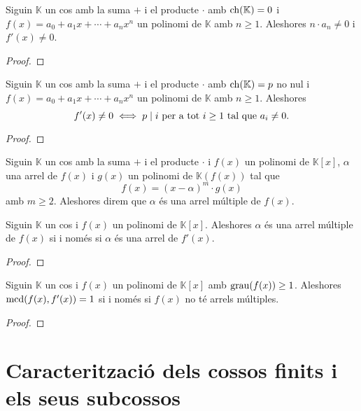 \documentclass[../Apunts.tex]{subfiles}
\begin{document}
	\begin{proposition}
		Siguin \(\mathbb{K}\) un cos amb la suma \(+\) i el producte \(\cdot\) amb \(\operatorname{ch}(\mathbb{K})=0\) i \(f(x)=a_{0}+a_{1}x+\cdots+a_{n}x^{n}\) un polinomi de \(\mathbb{K}\) amb \(n\geq1\). Aleshores \(n\cdot a_{n}\neq0\) i \(f'(x)\neq0\).
		\begin{proof}
		\end{proof}
	\end{proposition}
	\begin{proposition}
		Siguin \(\mathbb{K}\) un cos amb la suma \(+\) i el producte \(\cdot\) amb \(\operatorname{ch}(\mathbb{K})=p\) no nul i \(f(x)=a_{0}+a_{1}x+\cdots+a_{n}x^{n}\) un polinomi de \(\mathbb{K}\) amb \(n\geq1\). Aleshores
		\[f'(x)\neq0\iff p\mathrel{|} i\text{ per a tot }i\geq1\text{ tal que }a_{i}\neq0.\]
		\begin{proof}
		\end{proof}
	\end{proposition}
	\begin{definition}
		\label{def:arrel múltiple}
		Siguin \(\mathbb{K}\) un cos amb la suma \(+\) i el producte \(\cdot\) i \(f(x)\) un polinomi de \(\mathbb{K}[x]\), \(\alpha\) una arrel de \(f(x)\) i \(g(x)\) un polinomi de \(\mathbb{K}(f(x))\) tal que 
		\[f(x)=(x-\alpha)^{m}\cdot g(x)\]
		amb \(m\geq2\). Aleshores direm que \(\alpha\) és una arrel múltiple de \(f(x)\).
	\end{definition}
	\begin{proposition}
		Siguin \(\mathbb{K}\) un cos i \(f(x)\) un polinomi de \(\mathbb{K}[x]\). Aleshores \(\alpha\) és una arrel múltiple de \(f(x)\) si i només si \(\alpha\) és una arrel de \(f'(x)\).
		\begin{proof}
		\end{proof}
	\end{proposition}
	\begin{corollary}
		Siguin \(\mathbb{K}\) un cos i \(f(x)\) un polinomi de \(\mathbb{K}[x]\) amb \(\operatorname{grau}(f(x))\geq1\). Aleshores \(\operatorname{mcd}(f(x),f'(x))=1\) si i només si \(f(x)\) no té arrels múltiples.
		\begin{proof}
		\end{proof}
	\end{corollary}
	\section{Caracterització dels cossos finits i els seus subcossos}
\end{document}
